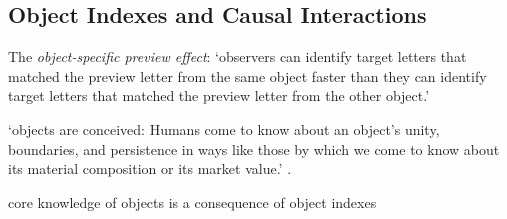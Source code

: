 \documentclass[12pt]{extarticle}
\begin{document}
\begin{multicols}{3}
 
 
\section{Object Indexes and Causal Interactions}
 
The \emph{object-specific preview effect}: ‘observers can identify target letters that matched the preview letter from the same object faster than they can identify target letters that matched the preview letter from the other object.’
\citep[p.\ 2]{Krushke:1996ge}
 
‘objects are conceived: Humans come to know about an object’s unity, boundaries, and persistence in ways like those by which we come to know about its material composition or its market value.’
\citep[p.\ 198]{Spelke:1988xc}.
 
core knowledge of objects is a consequence of object indexes
\citep{Leslie:1998zk,Carey:2001ue}
 
 
 
 
 
 
 
\footnotesize 


\end{multicols}
\end{document}
